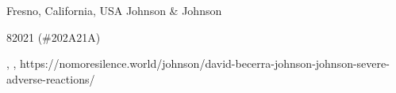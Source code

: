           {
            Fresno, California, USA
          }
          {
          }
          {
            Johnson \& Johnson
          }
          {
            \date{16}{8}{2021} (\#202A21A)
          }
          {
            ,
            ,
          }
          {
            https://nomoresilence.world/johnson/david-becerra-johnson-johnson-severe-adverse-reactions/
          }

